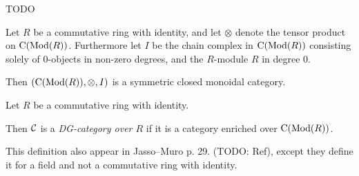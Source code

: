             


\begin{remark}
    TODO
\end{remark}

\begin{fact}[nlab]
    Let \( R \) be a commutative ring with identity, and let \( \otimes \) denote the tensor product on \( \operatorname{C} (\operatorname{Mod}(R)) \). Furthermore let \( I \) be the chain complex in \( \operatorname{C} (\operatorname{Mod}(R)) \) consisting solely of \( 0 \)-objects in non-zero degrees, and the \( R \)-module \( R \) in degree 0. 

    Then \( (\operatorname{C} (\operatorname{Mod}(R)), \otimes, I) \) is a symmetric closed monoidal category.
\end{fact}

\begin{definition}%
    Let \( R \) be a commutative ring with identity.

    Then \( {\mathcal{C}} \) is a \emph{DG-category over \( R \)} if it is a category enriched over \( \operatorname{C} (\operatorname{Mod}(R)) \).
\end{definition}
This definition also appear in Jasso--Muro p. 29. (TODO: Ref), except they define it for a field and not a commutative ring with identity.

